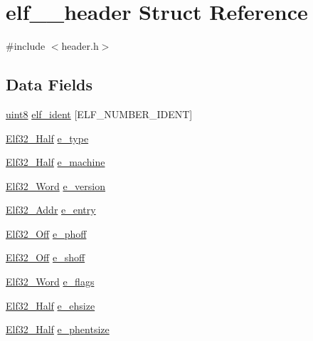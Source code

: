 \hypertarget{structelf__32__header}{
\section{elf\_\_\-header Struct Reference}
\label{structelf__32__header}
}


{\ttfamily \#include $<$header.h$>$}

\subsection*{Data Fields}
\begin{DoxyCompactItemize}
\item 
\hyperlink{int__types_8h_adde6aaee8457bee49c2a92621fe22b79}{uint8} \hyperlink{structelf__32__header_ad6b49380ff71793547a712aa8d24c5fe}{elf\_\-ident} \mbox{[}ELF\_\-NUMBER\_\-IDENT\mbox{]}
\item 
\hyperlink{header_8h_a36b5c3e0acdf5b2949591cd07480d10b}{Elf32\_\-Half} \hyperlink{structelf__32__header_a9b5c0b9a83cd0c472290a81676b4119f}{e\_\-type}
\item 
\hyperlink{header_8h_a36b5c3e0acdf5b2949591cd07480d10b}{Elf32\_\-Half} \hyperlink{structelf__32__header_a4fc95a48457d0bbf3937dfabcb4152ba}{e\_\-machine}
\item 
\hyperlink{header_8h_aaf2adb6079d594afee7de40cee594c34}{Elf32\_\-Word} \hyperlink{structelf__32__header_ab8b2dd687058469e74ec1cda4e924add}{e\_\-version}
\item 
\hyperlink{header_8h_a6041cee195469c34b94c8605b53a98f9}{Elf32\_\-Addr} \hyperlink{structelf__32__header_a6c0fef788e2dc2043aa91b26429459bf}{e\_\-entry}
\item 
\hyperlink{header_8h_aa29786fd537fb0970d39bb3b9ed48e96}{Elf32\_\-Off} \hyperlink{structelf__32__header_a3d616010b5daba4da505f8f3ab1f3431}{e\_\-phoff}
\item 
\hyperlink{header_8h_aa29786fd537fb0970d39bb3b9ed48e96}{Elf32\_\-Off} \hyperlink{structelf__32__header_aeb68c7843a97cbff85af083bbe583ae0}{e\_\-shoff}
\item 
\hyperlink{header_8h_aaf2adb6079d594afee7de40cee594c34}{Elf32\_\-Word} \hyperlink{structelf__32__header_a8f71f679060089292a31b5e948815215}{e\_\-flags}
\item 
\hyperlink{header_8h_a36b5c3e0acdf5b2949591cd07480d10b}{Elf32\_\-Half} \hyperlink{structelf__32__header_accab601e805e6f7088fcf56e50cde7d0}{e\_\-ehsize}
\item 
\hyperlink{header_8h_a36b5c3e0acdf5b2949591cd07480d10b}{Elf32\_\-Half} \hyperlink{structelf__32__header_af679dc989e4b55d4b74806a1d2590187}{e\_\-phentsize}

\end{DoxyCompactItemize}
